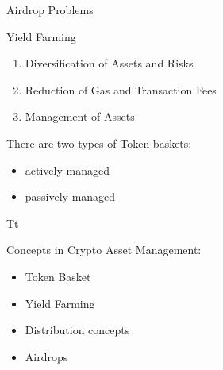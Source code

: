 \documentclass[handout]{beamer}
\begin{document}
\begin{frame}{Airdrop Problems}
	\vspace{1.5em}
	\scalebox{0.66}{
	
		\begin{tikzpicture}
			
		\end{tikzpicture}
	}	
	
\end{frame}


\begin{frame}{Yield Farming}

 \vspace{1em}

	\begin{enumerate}
		\item<1-> Diversification of Assets and Risks
		\item<2-> Reduction of Gas and Transaction Fees
		\item<3-> Management of Assets
	\end{enumerate}
	
\vspace{1em}


There are two types of Token baskets: \vspace{1em}
	
	\begin{itemize}
		\item<4-> actively managed
		\item<5-> passively managed
	\end{itemize}
	

\end{frame}



\begin{frame}{Tt}

Concepts in Crypto Asset Management: \\ \vspace{1em}
	
	\begin{itemize}
		\item<1-> Token Basket 
		\item<2-> Yield Farming
		\item<3-> Distribution concepts
		\item<4-> Airdrops
	\end{itemize}

\end{frame}
\end{document}
